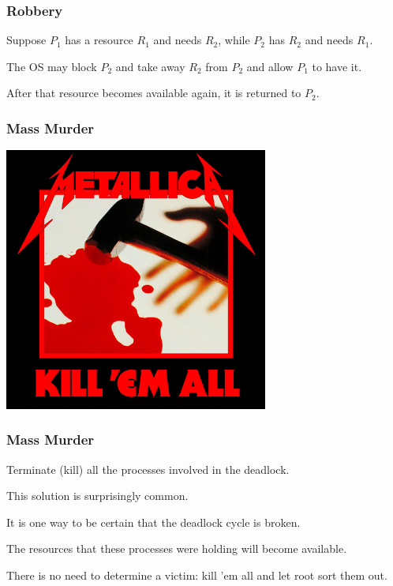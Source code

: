 \begin{frame}
\frametitle{Robbery}


Suppose $P_{1}$ has a resource $R_{1}$ and needs $R_{2}$, while $P_{2}$ has $R_{2}$ and needs $R_{1}$. 

The OS may block $P_{2}$ and take away $R_{2}$ from $P_{2}$ and allow $P_{1}$ to have it. 

After that resource becomes available again, it is returned to $P_{2}$.


\end{frame}

\begin{frame}
\frametitle{Mass Murder}

\begin{center}
\includegraphics[width=0.65\textwidth]{images/killemall.jpg}
\end{center}

\end{frame}

\begin{frame}
\frametitle{Mass Murder}

Terminate (kill) all the processes involved in the deadlock. 

This solution is surprisingly common. 

It is one way to be certain that the deadlock cycle is broken. 

The resources that these processes were holding will become available. 

There is no need to determine a victim: kill 'em all and let root sort them out.

\end{frame}

